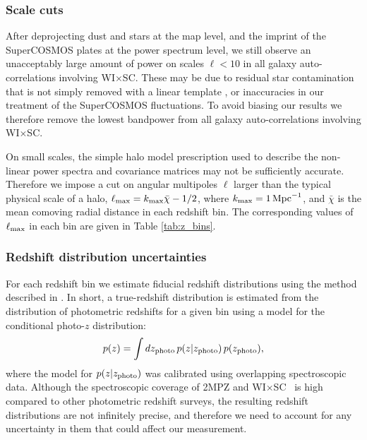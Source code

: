 \documentclass[useAMS,usenatbib]{mn2e}
\newcommand{\wisc}{WI$\times$SC}
\begin{document}
    \subsubsection{Scale cuts}\label{sssec:methods.syst.scales}
      After deprojecting dust and stars at the map level, and the imprint of the SuperCOSMOS plates at the power spectrum level, we still observe an unacceptably large amount of power on scales $\ell<10$ in all galaxy auto-correlations involving \wisc. These may be due to residual star contamination that is not simply removed with a linear template \citep{2018arXiv181208182X}, or inaccuracies in our treatment of the SuperCOSMOS fluctuations. To avoid biasing our results we therefore remove the lowest bandpower from all galaxy auto-correlations involving \wisc.
      
      On small scales, the simple halo model prescription used to describe the non-linear power spectra and covariance matrices may not be sufficiently accurate. Therefore we impose a cut on angular multipoles $\ell$ larger than the typical physical scale of a halo, $\ell_{\rm max}=k_{\rm max}\bar{\chi}-1/2$, where $k_{\rm max}=1\,{\rm Mpc}^{-1}$, and $\bar{\chi}$ is the mean comoving radial distance in each redshift bin. The corresponding values of $\ell_{\rm max}$ in each bin are given in Table \ref{tab:z_bins}.
      
    \subsubsection{Redshift distribution uncertainties}\label{sssec:methods.syst.photoz}
      For each redshift bin we estimate fiducial redshift distributions using the method described in \cite{2018MNRAS.481.1133P}. In short, a true-redshift distribution is estimated from the distribution of photometric redshifts for a given bin using a model for the conditional photo-$z$ distribution:
      \begin{equation}\label{eq:nz_calc}
        p(z)=\int dz_{\rm photo}\,p(z|z_{\rm photo})\,p(z_{\rm photo}),
      \end{equation}
      where the model for $p(z|z_{\rm photo})$ was calibrated using overlapping spectroscopic data. Although the spectroscopic coverage of 2MPZ and \wisc~ is high compared to other photometric redshift surveys, the resulting redshift distributions are not infinitely precise, and therefore we need to account for any uncertainty in them that could affect our measurement.
\end{document}
